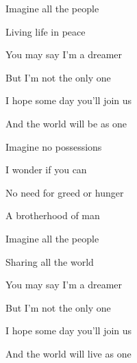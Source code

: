 \begin{song}
\bigskip

 Imagine all the people  \par
{}Living life in peace \par

\bigskip

 You may say I'm a dreamer  \par
{} But I'm not the only one   \par
{} I hope some day you'll join us  \par
{} And the world will be as one \par

\bigskip

 Imagine no possessions \par
{} I wonder if you   can  \par
{} No need for greed or hunger \par
{} A brotherhood of man \par

\bigskip

 Imagine all the people  \par
{}Sharing all the world \par

\bigskip

 You may say I'm a dreamer  \par
{} But I'm not the only one   \par
{} I hope some day you'll join us  \par
{} And the world will live as one \par

\end{song}
